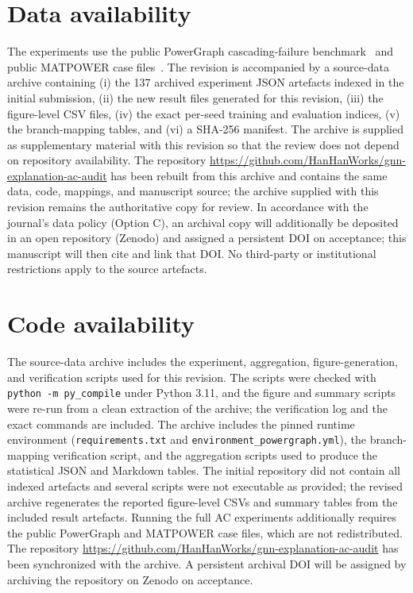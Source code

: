 \section*{Data availability}\label{data_availability}

The experiments use the public PowerGraph cascading-failure benchmark~\citep{varbella2024,varbella2023} and public MATPOWER case files~\citep{zimmerman2011}. The revision is accompanied by a source-data archive containing (i) the 137 archived experiment JSON artefacts indexed in the initial submission, (ii) the new result files generated for this revision, (iii) the figure-level CSV files, (iv) the exact per-seed training and evaluation indices, (v) the branch-mapping tables, and (vi) a SHA-256 manifest. The archive is supplied as supplementary material with this revision so that the review does not depend on repository availability. The repository \url{https://github.com/HanHanWorks/gnn-explanation-ac-audit} has been rebuilt from this archive and contains the same data, code, mappings, and manuscript source; the archive supplied with this revision remains the authoritative copy for review. In accordance with the journal's data policy (Option C), an archival copy will additionally be deposited in an open repository (Zenodo) and assigned a persistent DOI on acceptance; this manuscript will then cite and link that DOI. No third-party or institutional restrictions apply to the source artefacts.

\section*{Code availability}\label{code_availability}

The source-data archive includes the experiment, aggregation, figure-generation, and verification scripts used for this revision. The scripts were checked with \texttt{python -m py\_compile} under Python 3.11, and the figure and summary scripts were re-run from a clean extraction of the archive; the verification log and the exact commands are included. The archive includes the pinned runtime environment (\texttt{requirements.txt} and \texttt{environment\_powergraph.yml}), the branch-mapping verification script, and the aggregation scripts used to produce the statistical JSON and Markdown tables. The initial repository did not contain all indexed artefacts and several scripts were not executable as provided; the revised archive regenerates the reported figure-level CSVs and summary tables from the included result artefacts. Running the full AC experiments additionally requires the public PowerGraph and MATPOWER case files, which are not redistributed. The repository \url{https://github.com/HanHanWorks/gnn-explanation-ac-audit} has been synchronized with the archive. A persistent archival DOI will be assigned by archiving the repository on Zenodo on acceptance.

